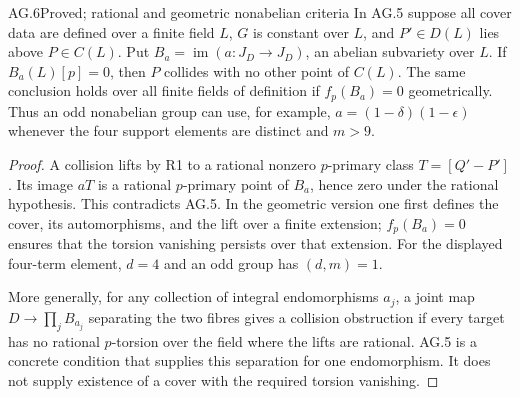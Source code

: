 \begin{claim}{AG.6}{Proved; rational and geometric nonabelian criteria}
In AG.5 suppose all cover data are defined over a finite field
$L$, $G$ is constant over $L$, and $P'\in D(L)$ lies above
$P\in C(L)$. Put $B_a=\operatorname{im}(a:J_D\to J_D)$,
an abelian subvariety over $L$. If $B_a(L)[p]=0$, then $P$
collides with no other point of $C(L)$. The same conclusion
holds over all finite fields of definition if $f_p(B_a)=0$
geometrically. Thus an odd nonabelian group can use, for
example, $a=(1-\delta)(1-\epsilon)$ whenever the four support
elements are distinct and $m>9$.
\end{claim}
\begin{proof}
A collision lifts by R1 to a rational nonzero $p$-primary
class $T=[Q'-P']$. Its image $aT$ is a rational $p$-primary
point of $B_a$, hence zero under the rational hypothesis.
This contradicts AG.5. In the geometric version one first
defines the cover, its automorphisms, and the lift over a
finite extension; $f_p(B_a)=0$ ensures that the torsion
vanishing persists over that extension. For the displayed
four-term element, $d=4$ and an odd group has $(d,m)=1$.

More generally, for any collection of integral endomorphisms
$a_j$, a joint map $D\to\prod_j B_{a_j}$ separating the two
fibres gives a collision obstruction if every target has no
rational $p$-torsion over the field where the lifts are rational.
AG.5 is a concrete condition that supplies this separation
for one endomorphism. It does not supply existence of a
cover with the required torsion vanishing.
\end{proof}

